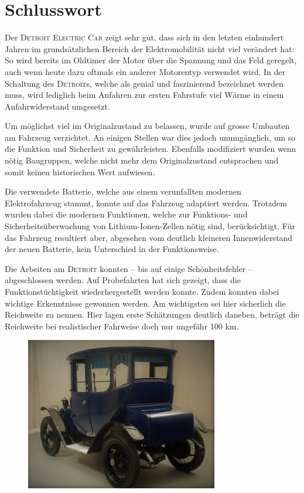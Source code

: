 \chapter{Schlusswort}
Der \textsc{Detroit Electric Car} zeigt sehr gut, dass sich in den letzten einhundert Jahren im grundsätzlichen Bereich der Elektromobilität nicht viel verändert hat: So wird bereits im Oldtimer der Motor über die Spannung und das Feld geregelt, auch wenn heute dazu oftmals ein anderer Motorentyp verwendet wird. In der Schaltung des \textsc{Detroit}s, welche als genial und faszinierend bezeichnet werden muss, wird lediglich beim Anfahren zur ersten Fahrstufe viel Wärme in einem Anfahrwiderstand umgesetzt.

Um möglichst viel im Originalzustand zu belassen, wurde auf grosse Umbauten am Fahrzeug verzichtet. An einigen Stellen war dies jedoch unumgänglich, um so die Funktion und Sicherheit zu gewährleisten. Ebenfalls modifiziert wurden wenn nötig Baugruppen, welche nicht mehr dem Originalzustand entsprachen und somit keinen historischen Wert aufwiesen.

Die verwendete Batterie, welche aus einem verunfallten modernen Elektrofahrzeug stammt, konnte auf das Fahrzeug adaptiert werden. Trotzdem wurden dabei die modernen Funktionen, welche zur Funktions- und Sicherheitsüberwachung von Lithium-Ionen-Zellen nötig sind, berücksichtigt. Für das Fahrzeug resultiert aber, abgesehen vom deutlich kleineren Innenwiderstand der neuen Batterie, kein Unterschied in der Funktionsweise.

Die Arbeiten am \textsc{Detroit} konnten -- bis auf einige Schönheitsfehler -- abgeschlossen werden. Auf Probefahrten hat sich gezeigt, dass die Funktionstüchtigkeit wiederhergestellt werden konnte. Zudem konnten dabei wichtige Erkenntnisse gewonnen werden. Am wichtigsten sei hier sicherlich die Reichweite zu nennen. Hier lagen erste Schätzungen deutlich daneben, beträgt die Reichweite bei realistischer Fahrweise doch nur ungefähr 100 km.

\begin{figure}[h]
	\centering
		\includegraphics[width=0.75\textwidth]{images/Ende.jpg}
	\label{fig:Ende}
\end{figure}